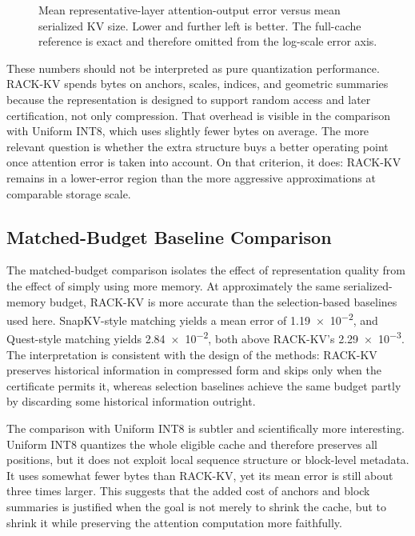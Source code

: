 \begin{figure}[t]
  \centering
  
  \caption{Mean representative-layer attention-output error versus mean serialized KV size. Lower and further left is better. The full-cache reference is exact and therefore omitted from the log-scale error axis.}
  \label{fig:errorbytes}
\end{figure}

These numbers should not be interpreted as pure quantization performance. RACK-KV spends bytes on anchors, scales, indices, and geometric summaries because the representation is designed to support random access and later certification, not only compression. That overhead is visible in the comparison with Uniform INT8, which uses slightly fewer bytes on average. The more relevant question is whether the extra structure buys a better operating point once attention error is taken into account. On that criterion, it does: RACK-KV remains in a lower-error region than the more aggressive approximations at comparable storage scale.

\subsection{Matched-Budget Baseline Comparison}

The matched-budget comparison isolates the effect of representation quality from the effect of simply using more memory. At approximately the same serialized-memory budget, RACK-KV is more accurate than the selection-based baselines used here. SnapKV-style matching yields a mean error of \num{1.19e-2}, and Quest-style matching yields \num{2.84e-2}, both above RACK-KV's \num{2.29e-3}. The interpretation is consistent with the design of the methods: RACK-KV preserves historical information in compressed form and skips only when the certificate permits it, whereas selection baselines achieve the same budget partly by discarding some historical information outright.

The comparison with Uniform INT8 is subtler and scientifically more interesting. Uniform INT8 quantizes the whole eligible cache and therefore preserves all positions, but it does not exploit local sequence structure or block-level metadata. It uses somewhat fewer bytes than RACK-KV, yet its mean error is still about three times larger. This suggests that the added cost of anchors and block summaries is justified when the goal is not merely to shrink the cache, but to shrink it while preserving the attention computation more faithfully.

